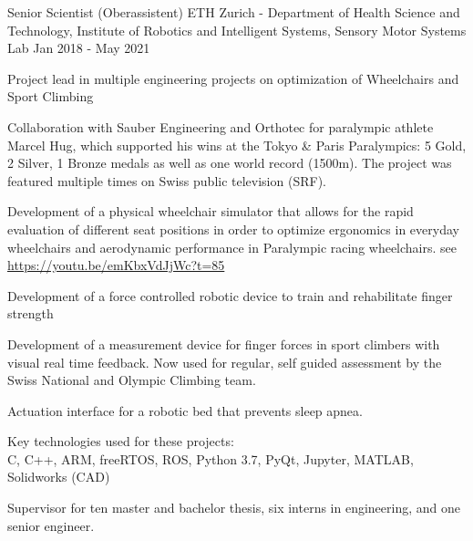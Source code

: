 \begin{cventries}
  \cventry
    {Senior Scientist (Oberassistent)} %
    {ETH Zurich - Department of Health Science and Technology, Institute of Robotics and Intelligent Systems, Sensory Motor Systems Lab} %
    {} %
    {Jan 2018 - May 2021} %
    {
      \begin{cvitems} %
        \item {Project lead in multiple engineering projects on optimization of Wheelchairs and Sport Climbing}
        \item {Collaboration with Sauber Engineering and Orthotec for paralympic athlete Marcel Hug, which supported his wins at the Tokyo \& Paris Paralympics: 5 Gold, 2 Silver, 1 Bronze medals as well as one world record (1500m). The project was featured multiple times on Swiss public television (SRF).}
        \item {Development of a physical wheelchair simulator that allows for the rapid evaluation of different seat positions in order to optimize ergonomics in everyday wheelchairs and aerodynamic performance in Paralympic racing wheelchairs. see \url{https://youtu.be/emKbxVdJjWc?t=85}}
        \item {Development of a force controlled robotic device to train and rehabilitate finger strength}
        \item {Development of a measurement device for finger forces in sport climbers with visual real time feedback. Now used for regular, self guided assessment by the Swiss National and Olympic Climbing team.}
        \item {Actuation interface for a robotic bed that prevents sleep apnea.}
        \item {Key technologies used for these projects:\\C, C++, ARM, freeRTOS, ROS, Python 3.7, PyQt, Jupyter, MATLAB, Solidworks (CAD)}
        \item {Supervisor for ten master and bachelor thesis, six interns in engineering, and one senior engineer.}
      \end{cvitems}
    }
  

\end{cventries}
